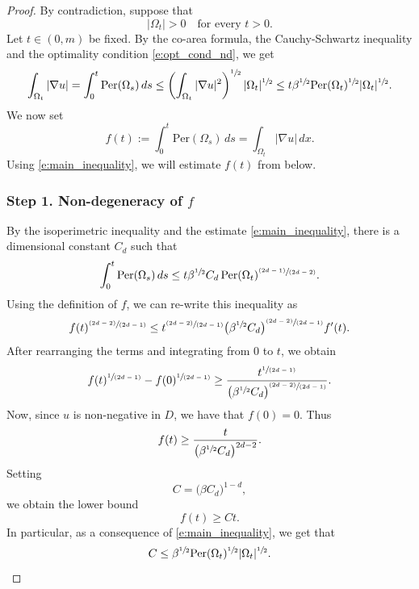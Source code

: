 \documentclass[JEP,XML,SOM,Unicode]{cedram}
\newcommand{\pspfrac}[2]{\sfrac{(#1)}{(#2)}}
\newcommand{\spfrac}[2]{\sfrac{#1}{(#2)}}
\newcommand{\Per}{\mathrm{Per}}
\theoremstyle{plain}
\theoremstyle{definition}
\begin{document}
\begin{proof}
By contradiction, suppose that
\[|\Omega_t|>0\quad\text{for every } t>0.\]
Let $t\in(0,m)$ be fixed. By the co-area formula, the Cauchy-Schwartz inequality and the optimality condition \eqref{e:opt_cond_nd}, we get
\begin{equation}\label{e:main_inequality}
\int_{\Omega_t}|\nabla u|=\int_0^t\Per(\Omega_s)\,ds\le \left(\int_{\Omega_t}|\nabla u|^2\right)^{\sfrac12}|\Omega_t|^{\sfrac12}\le t\beta^{\sfrac12}\Per(\Omega_t)^{\sfrac12}|\Omega_t|^{\sfrac12}.
\end{equation}
We now set
\[f(t):=\int_{0}^t \Per(\Omega_s)\,ds=\int_{\Omega_t}|\nabla u|\,dx.\]
Using \eqref{e:main_inequality}, we will estimate $f(t)$ from below.

\subsubsection*{Step 1. Non-degeneracy of $f$}
By the isoperimetric inequality and the estimate \eqref{e:main_inequality}, there is a dimensional constant $C_d$ such that
\[\int_{0}^t \Per(\Omega_s)\,ds\le t\beta^{\sfrac12}C_d\,\Per(\Omega_t)^{\pspfrac{2d-1}{2d-2}}.\]
Using the definition of $f$, we can re-write this inequality as
\[f(t)^{\pspfrac{2d-2}{2d-1}}\le t^{\pspfrac{2d-2}{2d-1}}\big(\beta^{\sfrac12}C_d\big)^{\pspfrac{2d-2}{2d-1}}f'(t).\]
After rearranging the terms and integrating from $0$ to $t$, we obtain
\[f(t)^{\spfrac1{2d-1}}-f(0)^{\spfrac1{2d-1}}\ge \frac{t^{\spfrac1{2d-1}}}{\big(\beta^{\sfrac12}C_d\big)^{\pspfrac{2d-2}{2d-1}}}.\]
Now, since $u$ is non-negative in $D$, we have that $f(0)=0$. Thus
\[f(t)\ge \frac{t}{\big(\beta^{\sfrac12}C_d\big)^{{2d-2}}}.\]
Setting
\begin{equation}\label{e:def_C}
C=\big(\beta C_d\big)^{1-d},
\end{equation}
we obtain the lower bound
\[f(t)\ge Ct.\]
In particular, as a consequence of \eqref{e:main_inequality}, we get that
\begin{equation}\label{e:induction0}
C\le \beta^{\sfrac12} \Per(\Omega_t)^{\sfrac12}|\Omega_t|^{\sfrac12}.
\end{equation}


\end{proof}
\end{document}
